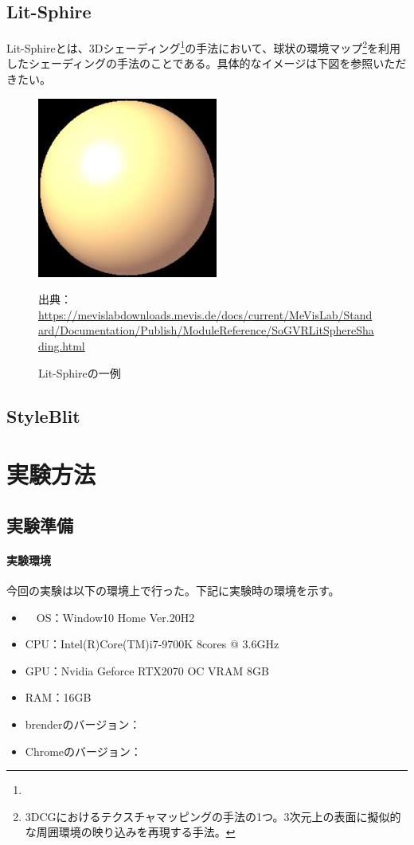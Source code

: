 \documentclass[dvipdfmx]{jsarticle}
\begin{document}
\subsection{Lit-Sphire}
Lit-Sphireとは、3Dシェーディング\footnote{}の手法において、球状の環境マップ\footnote{3DCGにおけるテクスチャマッピングの手法の1つ。3次元上の表面に擬似的な周囲環境の映り込みを再現する手法。}を利用したシェーディングの手法のことである。具体的なイメージは下図を参照いただきたい。
\begin{figure}[H]
  \centering
  \includegraphics[scale=0.4]{images/lit_demo.png}
  \caption{Lit-Sphireの一例}
  出典：\url{https://mevislabdownloads.mevis.de/docs/current/MeVisLab/Standard/Documentation/Publish/ModuleReference/SoGVRLitSphereShading.html}
\end{figure}

\subsection{StyleBlit}

\section{実験方法}
  \subsection{実験準備}
  \paragraph{実験環境}
    今回の実験は以下の環境上で行った。下記に実験時の環境を示す。
    \begin{itemize}
      \item　OS：Window10 Home Ver.20H2
      \item CPU：Intel(R)Core(TM)i7-9700K 8cores @ 3.6GHz
      \item GPU：Nvidia Geforce RTX2070 OC VRAM 8GB
      \item RAM：16GB
      \item brenderのバージョン：
      \item Chromeのバージョン：
    \end{itemize}
\end{document}
